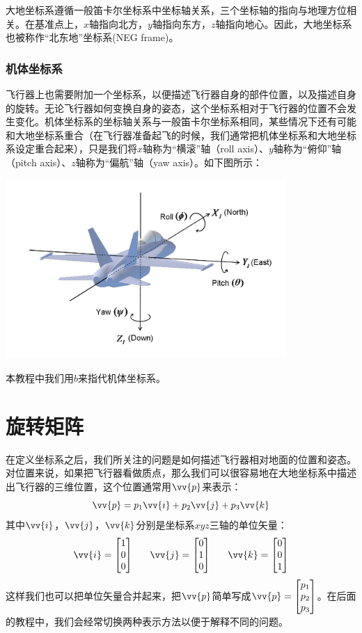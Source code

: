 \documentclass[11pt]{article}
\begin{document}
大地坐标系遵循一般笛卡尔坐标系中坐标轴关系，三个坐标轴的指向与地理方位相关。在基准点上，$x$轴指向北方，$y$轴指向东方，$z$轴指向地心。因此，大地坐标系也被称作“北东地”坐标系(NEG frame)。
\subsubsection{机体坐标系}\label{sec:bodyframe}
飞行器上也需要附加一个坐标系，以便描述飞行器自身的部件位置，以及描述自身的旋转。无论飞行器如何变换自身的姿态，这个坐标系相对于飞行器的位置不会发生变化。机体坐标系的坐标轴关系与一般笛卡尔坐标系相同，某些情况下还有可能和大地坐标系重合（在飞行器准备起飞的时候，我们通常把机体坐标系和大地坐标系设定重合起来），只是我们将$x$轴称为“横滚”轴（roll axis）、$y$轴称为“俯仰”轴（pitch axis）、$z$轴称为“偏航”轴（yaw axis）。如下图所示：
\begin{center}
\includegraphics[width=0.8\textwidth]{images/InertialFrame.png}
\end{center}

本教程中我们用$b$来指代机体坐标系。

\section{旋转矩阵}\label{sec:rotmtx}
在定义坐标系之后，我们所关注的问题是如何描述飞行器相对地面的位置和姿态。对位置来说，如果把飞行器看做质点，那么我们可以很容易地在大地坐标系中描述出飞行器的三维位置，这个位置通常用$\vv{p}$来表示：
$$
\vv{p} = p_1\vv{i}+p_2\vv{j}+p_3\vv{k}
$$
其中$\vv{i}$，$\vv{j}$，$\vv{k}$分别是坐标系$xyz$三轴的单位矢量：
$$
\vv{i} = \begin{bmatrix}
1\\0\\0
\end{bmatrix}\ \ \ \ \ 
\vv{j} = \begin{bmatrix}
0\\1\\0
\end{bmatrix}\ \ \ \ \ 
\vv{k} = \begin{bmatrix}
0\\0\\1
\end{bmatrix}
$$
这样我们也可以把单位矢量合并起来，把$\vv{p}$简单写成$\vv{p} = \begin{bmatrix}
p_1\\p_2\\p_3
\end{bmatrix}$。在后面的教程中，我们会经常切换两种表示方法以便于解释不同的问题。
\end{document}
